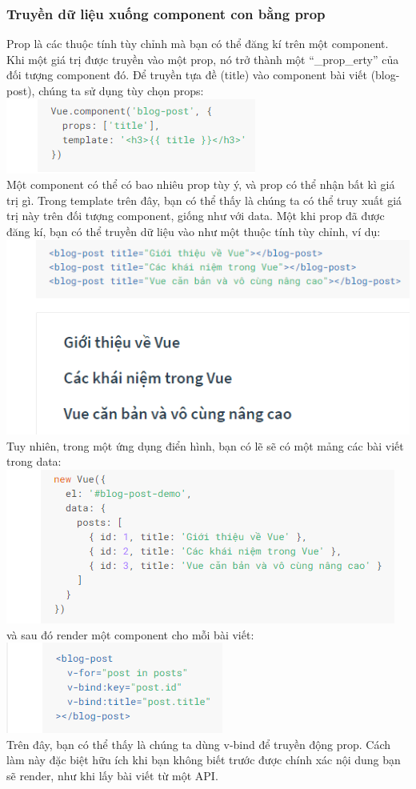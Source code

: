 \documentclass[12pt,a4paper]{report}
\begin{document}
\subsubsection{Truyền dữ liệu xuống component con bằng prop} Prop là các thuộc tính tùy chỉnh mà bạn có thể đăng kí trên một component. Khi một giá trị được truyền vào một prop, nó trở thành một “\_prop\_erty” của đối tượng component đó. Để truyền tựa đề (title) vào component bài viết (blog-post), chúng ta sử dụng tùy chọn props: \\\includegraphics[scale=1]{62}\\Một component có thể có bao nhiêu prop tùy ý, và prop có thể nhận bất kì giá trị gì. Trong template trên đây, bạn có thể thấy là chúng ta có thể truy xuất giá trị này trên đối tượng component, giống như với data. Một khi prop đã được đăng kí, bạn có thể truyền dữ liệu vào như một thuộc tính tùy chỉnh, ví dụ: \\\includegraphics[scale=1]{63}\\Tuy nhiên, trong một ứng dụng điển hình, bạn có lẽ sẽ có một mảng các bài viết trong data: \\\includegraphics[scale=1]{64}\\và sau đó render một component cho mỗi bài viết: \\\includegraphics[scale=1]{65} \\Trên đây, bạn có thể thấy là chúng ta dùng v-bind để truyền động prop. Cách làm này đặc biệt hữu ích khi bạn không biết trước được chính xác nội dung bạn sẽ render, như khi lấy bài viết từ một API.
\end{document}
